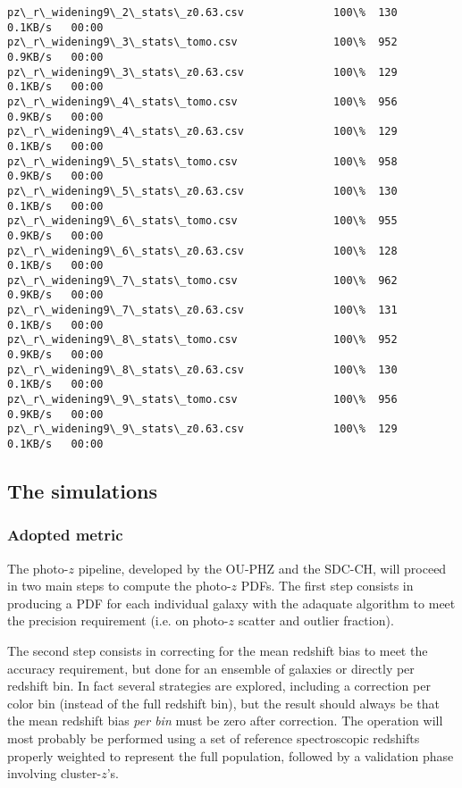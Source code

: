 \documentclass[11pt]{article}
\begin{document}
\begin{Verbatim}[commandchars=\\\{\}]
pz\_r\_widening9\_2\_stats\_z0.63.csv              100\%  130     0.1KB/s   00:00    
pz\_r\_widening9\_3\_stats\_tomo.csv               100\%  952     0.9KB/s   00:00    
pz\_r\_widening9\_3\_stats\_z0.63.csv              100\%  129     0.1KB/s   00:00    
pz\_r\_widening9\_4\_stats\_tomo.csv               100\%  956     0.9KB/s   00:00    
pz\_r\_widening9\_4\_stats\_z0.63.csv              100\%  129     0.1KB/s   00:00    
pz\_r\_widening9\_5\_stats\_tomo.csv               100\%  958     0.9KB/s   00:00    
pz\_r\_widening9\_5\_stats\_z0.63.csv              100\%  130     0.1KB/s   00:00    
pz\_r\_widening9\_6\_stats\_tomo.csv               100\%  955     0.9KB/s   00:00    
pz\_r\_widening9\_6\_stats\_z0.63.csv              100\%  128     0.1KB/s   00:00    
pz\_r\_widening9\_7\_stats\_tomo.csv               100\%  962     0.9KB/s   00:00    
pz\_r\_widening9\_7\_stats\_z0.63.csv              100\%  131     0.1KB/s   00:00    
pz\_r\_widening9\_8\_stats\_tomo.csv               100\%  952     0.9KB/s   00:00    
pz\_r\_widening9\_8\_stats\_z0.63.csv              100\%  130     0.1KB/s   00:00    
pz\_r\_widening9\_9\_stats\_tomo.csv               100\%  956     0.9KB/s   00:00    
pz\_r\_widening9\_9\_stats\_z0.63.csv              100\%  129     0.1KB/s   00:00    

    \end{Verbatim}

    \subsection{The simulations}\label{the-simulations}

\subsubsection{Adopted metric}\label{adopted-metric}

The photo-\(z\) pipeline, developed by the OU-PHZ and the SDC-CH, will
proceed in two main steps to compute the photo-\(z\) PDFs. The first
step consists in producing a PDF for each individual galaxy with the
adaquate algorithm to meet the precision requirement (i.e. on
photo-\(z\) scatter and outlier fraction).

The second step consists in correcting for the mean redshift bias to
meet the accuracy requirement, but done for an ensemble of galaxies or
directly per redshift bin. In fact several strategies are explored,
including a correction per color bin (instead of the full redshift bin),
but the result should always be that the mean redshift bias \emph{per
bin} must be zero after correction. The operation will most probably be
performed using a set of reference spectroscopic redshifts properly
weighted to represent the full population, followed by a validation
phase involving cluster-\(z\)'s.
\end{document}
